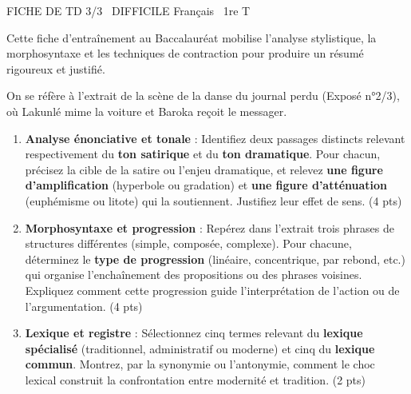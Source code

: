 \documentclass[11pt]{article}
\begin{document}
\begin{tcolorbox}[enhanced,colback=popink,colframe=popink,arc=10pt,boxrule=0pt,left=12pt,right=12pt,top=9pt,bottom=9pt]
{\color{white}\popxbold\small FICHE DE TD 3/3 \textbullet\ DIFFICILE \hfill Français \textbullet\ 1re T\par}
\end{tcolorbox}
\vspace{4pt}
\noindent Cette fiche d'entraînement au Baccalauréat mobilise l'analyse stylistique, la morphosyntaxe et les techniques de contraction pour produire un résumé rigoureux et justifié.

\begin{exercice}
On se réfère à l'extrait de la scène de la danse du journal perdu (Exposé n°2/3), où Lakunlé mime la voiture et Baroka reçoit le messager.
\begin{enumerate}
    \item \textbf{Analyse énonciative et tonale} : Identifiez deux passages distincts relevant respectivement du \textbf{ton satirique} et du \textbf{ton dramatique}. Pour chacun, précisez la cible de la satire ou l'enjeu dramatique, et relevez \textbf{une figure d'amplification} (hyperbole ou gradation) et \textbf{une figure d'atténuation} (euphémisme ou litote) qui la soutiennent. Justifiez leur effet de sens. (4 pts)
    \item \textbf{Morphosyntaxe et progression} : Repérez dans l'extrait trois phrases de structures différentes (simple, composée, complexe). Pour chacune, déterminez le \textbf{type de progression} (linéaire, concentrique, par rebond, etc.) qui organise l'enchaînement des propositions ou des phrases voisines. Expliquez comment cette progression guide l'interprétation de l'action ou de l'argumentation. (4 pts)
    \item \textbf{Lexique et registre} : Sélectionnez cinq termes relevant du \textbf{lexique spécialisé} (traditionnel, administratif ou moderne) et cinq du \textbf{lexique commun}. Montrez, par la synonymie ou l'antonymie, comment le choc lexical construit la confrontation entre modernité et tradition. (2 pts)
\end{enumerate}
\end{exercice}
\end{document}
